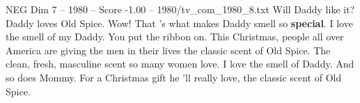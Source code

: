 \begin{textsample}{NEG Dim 7 – 1980 – Score -1.00 – 1980/tv\_com\_1980\_8.txt}  \label{ex:f7_neg_051}
Will Daddy like it?
Daddy loves Old Spice.
Wow!
That 's what makes Daddy smell so \textbf{special}.
I love the smell of my Daddy.
You put the ribbon on.
This Christmas, people all over America are giving the men in their lives the classic scent of Old Spice.
The clean, fresh, masculine scent so many women love.
I love the smell of Daddy.
And so does Mommy.
For a Christmas gift he 'll really love, the classic scent of Old Spice.

\end{textsample}
